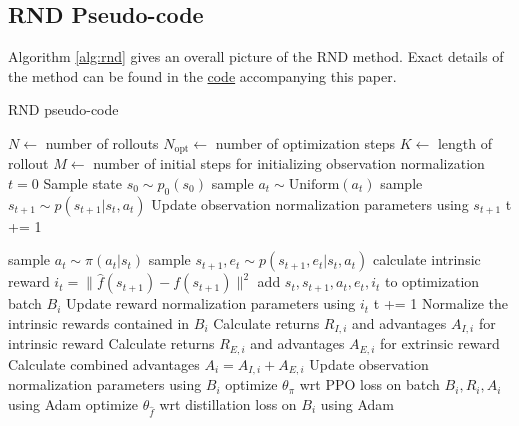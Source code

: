 \documentclass{article} \usepackage[dvipsnames]{xcolor}
\begin{document}
\subsection{RND Pseudo-code}
Algorithm \ref{alg:rnd} gives an overall picture of the RND method. Exact details of the method can be found in the \href{https://github.com/openai/random-network-distillation}{code} accompanying this paper.
\begin{algorithm}[!ht]
    \caption{RND pseudo-code}
    \label{alg:rnd}
    \begin{algorithmic}
        \STATE $N \gets$  number of rollouts
        \STATE $N_{\text{opt}} \gets$ number of optimization steps
        \STATE $K \gets$ length of rollout
        \STATE $M \gets$ number of initial steps for initializing observation normalization 
        \STATE $t=0$ 
        \STATE Sample state $s_0\sim p_0(s_0)$
            \STATE sample $a_t \sim \text{Uniform}(a_t)$
            \STATE sample $s_{t+1} \sim p(s_{t+1} | s_t, a_t)$
            \STATE Update observation normalization parameters using $s_{t+1}$
            \STATE t += 1
            
        \ENDFOR
               \STATE sample $a_t \sim \pi(a_t|s_t)$
               \STATE sample $s_{t+1}, e_{t} \sim p(s_{t+1}, e_{t} | s_t, a_t)$
               \STATE calculate intrinsic reward $i_t = \lVert \hat{f}(s_{t+1}) - f(s_{t+1}) \rVert^2$
               \STATE add $s_t, s_{t+1}, a_t, e_t, i_t$ to optimization batch $B_{i}$
               \STATE Update reward normalization parameters using $i_{t}$
               \STATE t += 1
            \ENDFOR
            \STATE Normalize the intrinsic rewards contained in $B_i$
            \STATE Calculate returns $R_{I,i}$ and advantages $A_{I,i}$ for intrinsic reward
            \STATE Calculate returns $R_{E,i}$ and advantages $A_{E,i}$ for extrinsic reward
            \STATE Calculate combined advantages $A_i = A_{I, i} + A_{E,i}$
            \STATE Update observation normalization parameters using $B_i$
            \STATE optimize $\theta_{\pi}$ wrt PPO loss on batch $B_i, R_i, A_i$ using Adam
            \STATE optimize $\theta_{\hat{f}}$ wrt distillation loss on $B_i$ using Adam
            \ENDFOR
        \ENDFOR
    \end{algorithmic}
    \end{algorithm}
\end{document}
